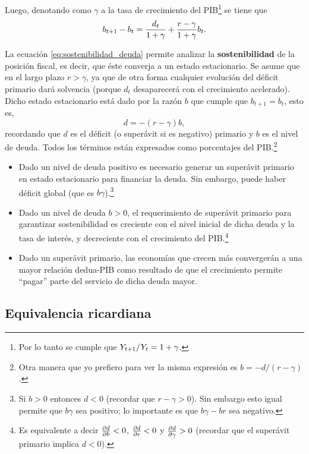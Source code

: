\documentclass[DeGregorioResumen]{subfiles}
\begin{document}
Luego, denotando como $\gamma $ a la tasa de crecimiento del PIB\footnote{Por lo tanto se cumple que ${Y}_{t+1}/Y_t = 1+\gamma$.} se tiene que
\begin{equation}
{b}_{t+1}-b_t = \frac{d_t}{1+\gamma}+\frac{r-\gamma}{1+\gamma}b_t.
\label{eq:sostenibilidad_deuda}
\end{equation}

La ecuación \eqref{eq:sostenibilidad_deuda} permite analizar la \textbf{sostenibilidad} de la posición fiscal, es decir, que éste converja a un estado estacionario. Se asume que en el largo plazo $r>\gamma $, ya que de otra forma cualquier evolución del déficit primario dará solvencia (porque $d_t $ desaparecerá con el crecimiento acelerado). Dicho estado estacionario está dado por la razón $b$ que cumple que $b_{t+1}=b_t$, esto es,
\begin{equation}
d=-(r-\gamma)b,
\end{equation}
recordando que $d$ es el déficit (o superávit si es negativo) primario y $b$ es el nivel de deuda. Todos los términos están expresados como porcentajes del PIB.\footnote{Otra manera que yo prefiero para ver la misma expresión es $b=-d/(r-\gamma)$.}

\begin{itemize}
\item Dado un nivel de deuda positivo es necesario generar un superávit primario en estado estacionario para financiar la deuda. Sin embargo, puede haber déficit global (que es $b\gamma$).\footnote{Si $b>0$ entonces $d<0$ (recordar que $r-\gamma>0$). Sin embargo esto igual permite que $b\gamma$ sea positivo; lo importante es que $b\gamma-br$ sea negativo.}
\item Dado un nivel de deuda $b>0$, el requerimiento de superávit primario para garantizar sostenibilidad es creciente con el nivel inicial de dicha deuda y la tasa de interés, y decreciente con el crecimiento del PIB.\footnote{Es equivalente a decir $\frac{\partial d}{\partial b}<0$, $\frac{\partial d}{\partial r}<0$ y $\frac{\partial d}{\partial\gamma}>0$ (recordar que el superávit primario implica $d<0$).}
\item Dado un superávit primario, las economías que crecen más convergerán a una mayor relación dedua-PIB como resultado de que el crecimiento permite ``pagar'' parte del servicio de dicha deuda mayor.
\end{itemize}

\subsection{Equivalencia ricardiana}
\end{document}
